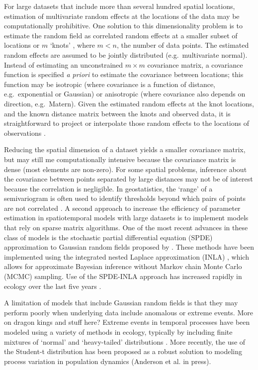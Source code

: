 \documentclass[12pt,english]{article}
\begin{document}
For large datasets that include more than several hundred spatial locations,
estimation of multivariate random effects at the locations of the data may be
computationally prohibitive. One solution to this dimensionality problem is to
estimate the random field as correlated random effects at a smaller subset of
locations or $m$ `knots' \citep[e.g.][]{latimer2009, shelton2014}, where $m
  < n$, the number of data points. The estimated random effects are assumed to
be jointly distributed (e.g.~multivariate normal). Instead of estimating an
unconstrained $m \times m$ covariance matrix, a covariance function is
specified \emph{a priori} to estimate the covariance between locations; this
function may be isotropic (where covariance is a function of distance,
e.g.~exponential or Gaussian) or anisotropic (where covariance also depends on
direction, e.g.~Matern). Given the estimated random effects at the knot
locations, and the known distance matrix between the knots and observed data,
it is straightforward to project or interpolate those random effects to the
locations of observations \citep{latimer2009, finley2009}.

Reducing the spatial dimension of a dataset yields a smaller covariance matrix,
but may still me computationally intensive because the covariance matrix is
dense (most elements are non-zero). For some spatial problems, inference about
the covariance between points separated by large distances may not be of
interest because the correlation is negligible. In geostatistics, the `range'
of a semivariogram is often used to identify thresholds beyond which pairs of
points are not correlated \citep{rossi1992}. A second approach to increase the
efficiency of parameter estimation in spatiotemporal models with large datasets
is to implement models that rely on sparse matrix algorithms. One of the most
recent advances in these class of models is the stochastic partial differential
equation (SPDE) approximation to Gaussian random fields proposed by
\citet{lindgren2011}. These methods have been implemented using the integrated
nested Laplace approximation (INLA) \citep{rue2009}, which allows for
approximate Bayesian inference without Markov chain Monte Carlo (MCMC)
sampling. Use of the SPDE-INLA approach has increased rapidly in ecology over
the last five years \citep[e.g.][]{illian2013, ono2016}.

A limitation of models that include Gaussian random fields is that they may
perform poorly when underlying data include anomalous or extreme events. More
on dragon kings and stuff here? Extreme events in temporal processes have been
modeled using a variety of methods in ecology, typically by including finite
mixtures of `normal' and `heavy-tailed' distributions \citep{everitt1996,
  ward2007, thorson2011}. More recently, the use of the Student-t distribution
has been proposed as a robust solution to modeling process variation in
population dynamics (Anderson et al. in press).
\end{document}

